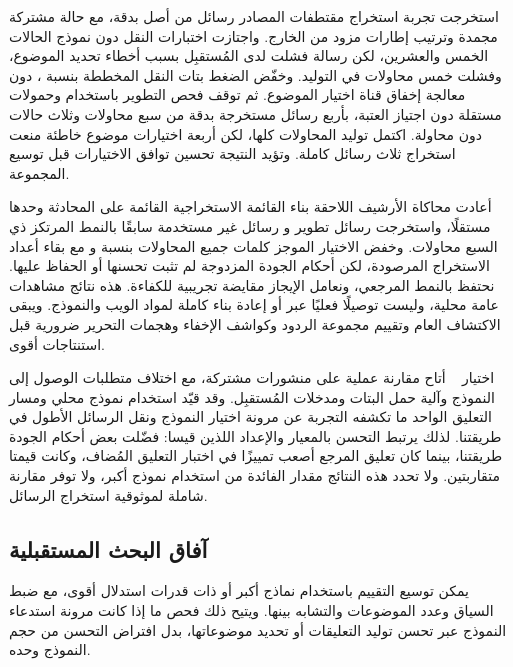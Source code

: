 استخرجت تجربة استخراج مقتطفات المصادر  رسائل من أصل  بدقة، مع حالة مشتركة مجمدة وترتيب إطارات مزود من الخارج. واجتازت اختبارات النقل دون نموذج الحالات الخمس والعشرين، لكن  رسالة فشلت لدى المُستقبِل بسبب أخطاء تحديد الموضوع، وفشلت خمس محاولات في التوليد. وخفّض الضغط بتات النقل المخططة بنسبة ، دون معالجة إخفاق قناة اختيار الموضوع.
ثم توقف فحص التطوير باستخدام  وحمولات مستقلة دون اجتياز العتبة، بأربع رسائل مستخرجة بدقة من سبع محاولات وثلاث حالات دون محاولة. اكتمل توليد المحاولات كلها، لكن أربعة اختيارات موضوع خاطئة منعت استخراج ثلاث رسائل كاملة. وتؤيد النتيجة تحسين توافق الاختيارات قبل توسيع المجموعة.

أعادت محاكاة الأرشيف اللاحقة بناء القائمة الاستخراجية القائمة على المحادثة وحدها مستقلًا، واستخرجت \NUM{\FreshDevSevenExact/\FreshAssigned} رسائل تطوير و\NUM{\FreshHeldSevenExact/\FreshAssigned} رسائل غير مستخدمة سابقًا بالنمط المرتكز ذي السبع محاولات. وخفض الاختيار الموجز كلمات جميع المحاولات بنسبة \NUM{\FreshDevSaving\%} و\NUM{\FreshHeldSaving\%} مع بقاء أعداد الاستخراج المرصودة، لكن أحكام الجودة المزدوجة لم تثبت تحسنها أو الحفاظ عليها. نحتفظ بالنمط المرجعي، ونعامل الإيجاز مقايضة تجريبية للكفاءة. هذه نتائج مشاهدات عامة محلية، وليست توصيلًا فعليًا عبر  أو إعادة بناء كاملة لمواد الويب والنموذج. ويبقى الاكتشاف العام وتقييم مجموعة الردود وكواشف الإخفاء وهجمات التحرير ضرورية قبل استنتاجات أقوى.

\label{par:baseline-interpretation}
اختيار ~\cite{lin2024zero} أتاح مقارنة عملية على منشورات مشتركة، مع اختلاف متطلبات الوصول إلى النموذج وآلية حمل البتات ومدخلات المُستقبِل. وقد قيّد استخدام نموذج محلي ومسار التعليق الواحد ما تكشفه التجربة عن مرونة اختيار النموذج ونقل الرسائل الأطول في طريقتنا. لذلك يرتبط التحسن بالمعيار والإعداد اللذين قيسا: فضّلت بعض أحكام الجودة طريقتنا، بينما كان تعليق المرجع أصعب تمييزًا في اختبار التعليق المُضاف، وكانت قيمتا  متقاربتين. ولا تحدد هذه النتائج مقدار الفائدة من استخدام نموذج أكبر، ولا توفر مقارنة شاملة لموثوقية استخراج الرسائل.

\subsection{آفاق البحث المستقبلية}

يمكن توسيع التقييم باستخدام نماذج أكبر أو ذات قدرات استدلال أقوى، مع ضبط السياق وعدد الموضوعات والتشابه بينها. ويتيح ذلك فحص ما إذا كانت مرونة استدعاء النموذج عبر  تحسن توليد التعليقات أو تحديد موضوعاتها، بدل افتراض التحسن من حجم النموذج وحده.

